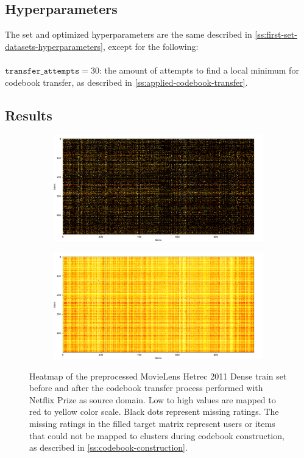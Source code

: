 \subsection{Hyperparameters}

The set and optimized hyperparameters are the same described in \autoref{ss:first-set-datasets-hyperparameters}, except for the following:\\\\
$\texttt{transfer\_attempts} = 30$: the amount of attempts to find a local minimum for codebook transfer, as described in \autoref{ss:applied-codebook-transfer}.

\clearpage


\subsection{Results}

\vspace*{\fill}
\begin{figure}[hbt!]
\centering
\begin{subfigure}{\textwidth}
\includegraphics[width=\textwidth]{pictures/movielens-target}
\end{subfigure}
\begin{subfigure}{\textwidth}
\includegraphics[width=\textwidth]{pictures/movielens-target-filled}
\end{subfigure}
\caption{Heatmap of the preprocessed MovieLens Hetrec 2011 Dense train set before and after the codebook transfer process performed with Netflix Prize as source domain. Low to high values are mapped to red to yellow color scale. Black dots represent missing ratings. The missing ratings in the filled target matrix represent users or items that could not be mapped to clusters during codebook construction, as described in \autoref{ss:codebook-construction}.}
\end{figure}
\vspace*{\fill}

